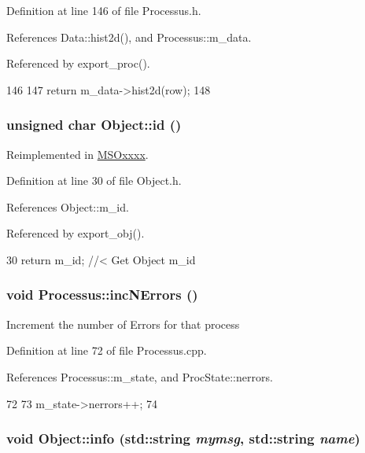 Definition at line 146 of file Processus.h.

References Data::hist2d(), and Processus::m\_\-data.

Referenced by export\_\-proc().


\begin{DoxyCode}
146                                    {
147     return m_data->hist2d(row);
148   }
\end{DoxyCode}
\hypertarget{classObject_af99145335cc61ff6e2798ea17db009d2}{
\subsubsection[{id}]{\setlength{\rightskip}{0pt plus 5cm}unsigned char Object::id ()}}
\label{classObject_af99145335cc61ff6e2798ea17db009d2}


Reimplemented in \hyperlink{classMSOxxxx_a0f14b23d31d8e7647184e99a89600cc3}{MSOxxxx}.

Definition at line 30 of file Object.h.

References Object::m\_\-id.

Referenced by export\_\-obj().


\begin{DoxyCode}
30 { return m_id;         } //< Get Object m_id 
\end{DoxyCode}
\hypertarget{classProcessus_abe603d0636f76db6aa6c5c60cf34c591}{
\subsubsection[{incNErrors}]{\setlength{\rightskip}{0pt plus 5cm}void Processus::incNErrors ()}}
\label{classProcessus_abe603d0636f76db6aa6c5c60cf34c591}
Increment the number of Errors for that process 

Definition at line 72 of file Processus.cpp.

References Processus::m\_\-state, and ProcState::nerrors.


\begin{DoxyCode}
72                            {
73   m_state->nerrors++;
74 }
\end{DoxyCode}
\hypertarget{classObject_a1ca123253dfd30fc28b156f521dcbdae}{
\subsubsection[{info}]{\setlength{\rightskip}{0pt plus 5cm}void Object::info (std::string {\em mymsg}, \/  std::string {\em name})}}
\label{classObject_a1ca123253dfd30fc28b156f521dcbdae}


